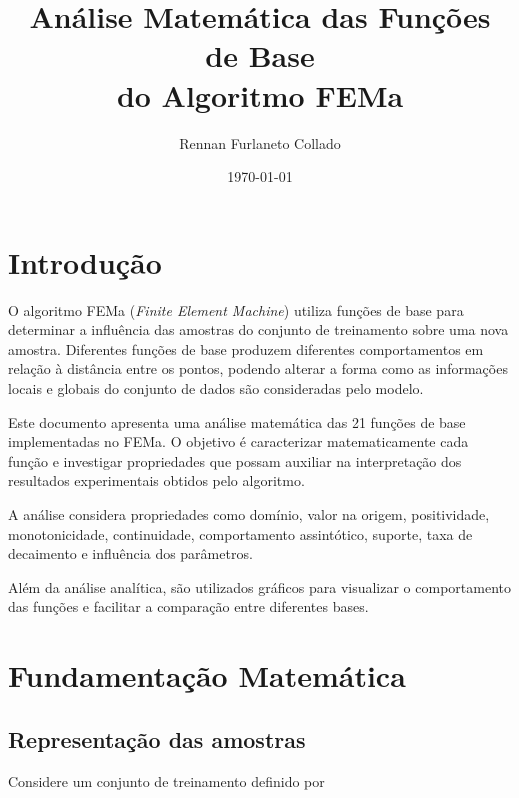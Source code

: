 \documentclass[12pt,a4paper]{article}
\title{
	\textbf{Análise Matemática das Funções de Base\\
		do Algoritmo FEMa}
}
\author{
	Rennan Furlaneto Collado
}
\date{\today}
\begin{document}
	
	\maketitle
	
	\tableofcontents
	
	\newpage
	
	
	\section{Introdução}
	
	O algoritmo FEMa (\textit{Finite Element Machine}) utiliza funções de
	base para determinar a influência das amostras do conjunto de treinamento
	sobre uma nova amostra. Diferentes funções de base produzem diferentes
	comportamentos em relação à distância entre os pontos, podendo alterar a
	forma como as informações locais e globais do conjunto de dados são
	consideradas pelo modelo.
	
	Este documento apresenta uma análise matemática das 21 funções de base
	implementadas no FEMa. O objetivo é caracterizar matematicamente cada
	função e investigar propriedades que possam auxiliar na interpretação dos
	resultados experimentais obtidos pelo algoritmo.
	
	A análise considera propriedades como domínio, valor na origem,
	positividade, monotonicidade, continuidade, comportamento assintótico,
	suporte, taxa de decaimento e influência dos parâmetros.
	
	Além da análise analítica, são utilizados gráficos para visualizar o
	comportamento das funções e facilitar a comparação entre diferentes bases.
	
	
	\section{Fundamentação Matemática}
	
	\subsection{Representação das amostras}
	
	Considere um conjunto de treinamento definido por
	
\end{document}
